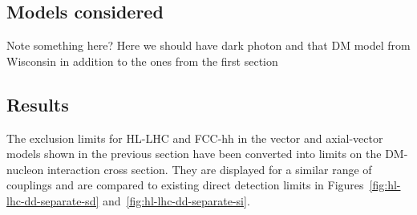 \documentclass[11pt]{article}
\begin{document}
\subsection{Models considered}

Note something here? Here we should have dark photon and that DM model from Wisconsin in addition to the ones from the first section

\subsection{Results}

The exclusion limits for HL-LHC and FCC-hh in the vector and axial-vector models shown in the previous section have been converted into limits on the DM-nucleon interaction cross section. They are displayed for a similar range of couplings and are compared to existing direct detection limits in Figures~\ref{fig:hl-lhc-dd-separate-sd} and~\ref{fig:hl-lhc-dd-separate-si}.
\end{document}
